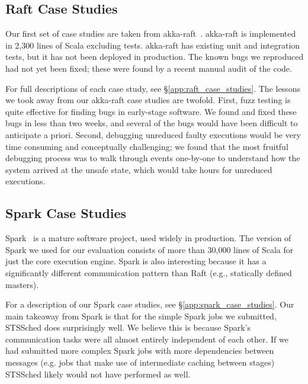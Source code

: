 \subsection{Raft Case Studies} Our first set of case studies are taken from
akka-raft~\cite{akka-raft}. akka-raft is implemented in 2,300 lines of Scala excluding tests. akka-raft has existing unit and integration tests, but it
has not been deployed in production. The known
bugs we reproduced had not yet been fixed; these were
found by a recent manual audit of the code.

For full descriptions of each case study, see \S\ref{app:raft_case_studies}.
The lessons we took away from our akka-raft case studies are twofold. First,
fuzz testing is quite effective for finding bugs in
early-stage software.
We found and fixed these
bugs in less than two weeks, and several of the
bugs would have
been difficult to anticipate a priori. Second, debugging unreduced faulty
executions would be very time consuming and conceptually challenging;
we found that the most fruitful debugging process was to walk through events
one-by-one to understand how the system arrived at the unsafe state, which
would take hours for unreduced executions.

\subsection{Spark Case Studies}

Spark~\cite{spark_repo} is a mature software project, used
widely in production. The version of Spark we used for our evaluation consists of more
than 30,000 lines of Scala for just the core execution engine.
Spark is also interesting because it has a significantly different
communication pattern than
Raft (e.g., statically defined masters).

For a description of our Spark case studies, see \S\ref{app:spark_case_studies}.
Our main takeaway from Spark is that for the simple Spark jobs we submitted,
STSSched does
surprisingly well. We believe this
is because Spark's communication tasks were all almost entirely independent
of each other. If we had
submitted more complex Spark jobs with more dependencies between messages
(e.g. jobs that make use of intermediate
caching between stages) STSSched likely would not have performed as well.


